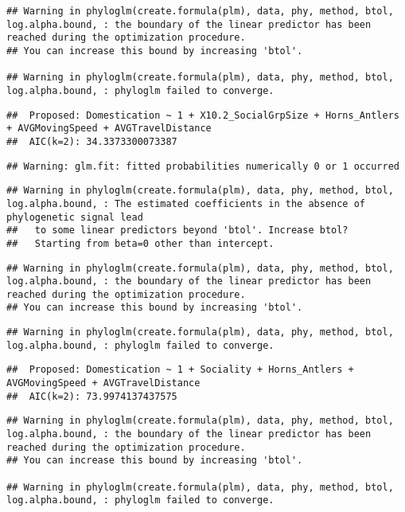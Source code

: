 \documentclass[
]{article}
\begin{document}
\begin{verbatim}
## Warning in phyloglm(create.formula(plm), data, phy, method, btol, log.alpha.bound, : the boundary of the linear predictor has been reached during the optimization procedure.
## You can increase this bound by increasing 'btol'.

## Warning in phyloglm(create.formula(plm), data, phy, method, btol, log.alpha.bound, : phyloglm failed to converge.
\end{verbatim}

\begin{verbatim}
##  Proposed: Domestication ~ 1 + X10.2_SocialGrpSize + Horns_Antlers + AVGMovingSpeed + AVGTravelDistance
##  AIC(k=2): 34.3373300073387
\end{verbatim}

\begin{verbatim}
## Warning: glm.fit: fitted probabilities numerically 0 or 1 occurred
\end{verbatim}

\begin{verbatim}
## Warning in phyloglm(create.formula(plm), data, phy, method, btol, log.alpha.bound, : The estimated coefficients in the absence of phylogenetic signal lead
##   to some linear predictors beyond 'btol'. Increase btol?
##   Starting from beta=0 other than intercept.
\end{verbatim}

\begin{verbatim}
## Warning in phyloglm(create.formula(plm), data, phy, method, btol, log.alpha.bound, : the boundary of the linear predictor has been reached during the optimization procedure.
## You can increase this bound by increasing 'btol'.
\end{verbatim}

\begin{verbatim}
## Warning in phyloglm(create.formula(plm), data, phy, method, btol, log.alpha.bound, : phyloglm failed to converge.
\end{verbatim}

\begin{verbatim}
##  Proposed: Domestication ~ 1 + Sociality + Horns_Antlers + AVGMovingSpeed + AVGTravelDistance
##  AIC(k=2): 73.9974137437575
\end{verbatim}

\begin{verbatim}
## Warning in phyloglm(create.formula(plm), data, phy, method, btol, log.alpha.bound, : the boundary of the linear predictor has been reached during the optimization procedure.
## You can increase this bound by increasing 'btol'.

## Warning in phyloglm(create.formula(plm), data, phy, method, btol, log.alpha.bound, : phyloglm failed to converge.
\end{verbatim}
\end{document}
